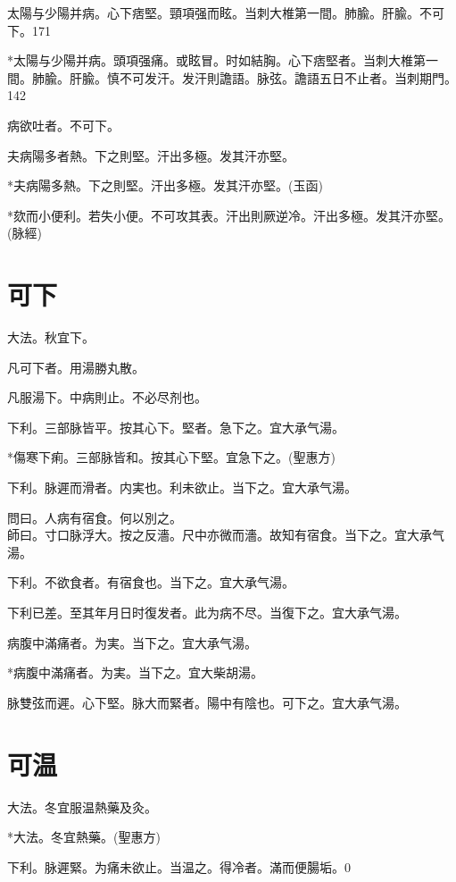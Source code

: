 \documentclass[b5paper,twoside,zihao=-4,UTF8]{ctexbook}
\begin{document}
太陽与少陽并病。心下痞堅。頸項强而眩。{当刺大椎第一間。肺腧。肝腧。}不可下。171

*太陽与少陽并病。頭項强痛。或眩冒。时如結胸。心下痞堅者。当刺大椎第一間。肺腧。肝腧。慎不可发汗。发汗則譫語。脉弦。譫語五日不止者。当刺期門。142

病欲吐者。不可下。

夫病陽多者熱。下之則堅。汗出多極。发其汗亦堅。

*夫病陽多熱。下之則堅。汗出多極。发其汗亦堅。(玉函)

*欬而小便利。若失小便。不可攻其表。汗出則厥逆冷。汗出多極。发其汗亦堅。(脉經)

\chapter{可下}

大法。秋宜下。

凡可下者。用湯勝丸散。

凡服湯下。中病則止。不必尽剂也。

下利。三部脉皆平。按其心下。堅者。急下之。宜{大}承气湯。

*傷寒下痢。三部脉皆和。按其心下堅。宜急下之。(聖惠方)

下利。脉遲而滑者。{内}実也。利未欲止。当下之。宜{大}承气湯。

問曰。人病有宿食。何以別之。\\
師曰。寸口脉浮大。按之反濇。尺中亦微而濇。故知有宿食。当下之。宜{大}承气湯。

下利。不欲食者。有宿食也。当下之。宜{大}承气湯。

下利{已}差。至其{年月日}时復发者。此为病不尽。当復下之。宜{大}承气湯。

病腹中滿痛者。为実。当下之。宜大承气湯。

*病腹中滿痛者。为実。当下之。宜大柴胡湯。

脉雙弦而遲。心下堅。脉大而緊者。陽中有陰也。可下之。宜{大}承气湯。

\chapter{可温}

大法。冬宜服温熱藥及灸。

*大法。冬宜熱藥。(聖惠方)

下利。脉遲緊。为痛未欲止。当温之。得冷者。滿而便腸垢。0
\end{document}

